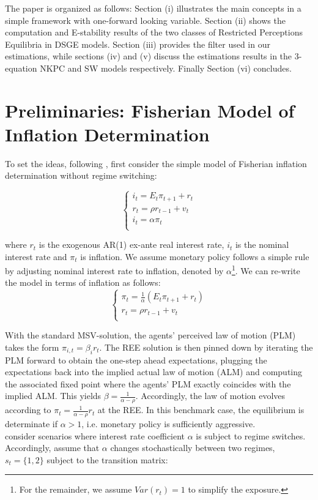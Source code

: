 \documentclass[12pt,reqno]{article}
\numberwithin{equation}{section}
\begin{document}
\noindent
The paper is organized as follows: Section (i) illustrates the main concepts in a simple framework with one-forward looking variable. Section (ii) shows the  computation and E-stability results of the two classes of Restricted Perceptions Equilibria in DSGE models. Section (iii) provides the filter used in our estimations, while sections (iv) and (v) discuss the estimations results in the 3-equation NKPC and SW models respectively. Finally Section (vi) concludes.   


\section{Preliminaries: Fisherian Model of Inflation Determination}



To set the ideas, following \cite{davig2007generalizing}, first consider the simple model of Fisherian inflation determination without regime switching: 


$$
\begin{cases}
i_t = E_t \pi_{t+1} + r_t \\
r_t = \rho r_{t-1} + v_t \\
i_t = \alpha\pi_t \\
\end{cases}
$$

where $ r_t $ is the exogenous AR(1) ex-ante real interest rate, $ i_t $ is the nominal interest rate and $\pi_t $ is inflation. We assume monetary policy follows a simple rule by adjusting nominal interest rate to inflation, denoted by $\alpha$\footnote{For the remainder, we assume $Var(r_t)=1$ to simplify the exposure.}. We can re-write the model in terms of inflation as follows: \\

$$
\begin{cases}
\pi_t = \frac{1}{\alpha}(E_t \pi_{t+1} + r_t) \\
r_t = \rho r_{t-1} + v_t \\
\end{cases}
$$

With the standard MSV-solution, the agents’ perceived law of motion (PLM) takes the form $ \pi_{i,t} = \beta_i r_t $. The REE solution is then pinned down by iterating the PLM forward to obtain the one-step ahead expectations, plugging the expectations back into the implied actual law of motion (ALM) and computing the associated fixed point where the agents’ PLM exactly coincides with the implied ALM. This yields $\beta= \frac{1}{\alpha-\rho}$. Accordingly, the law of motion evolves according to $\pi_t= \frac{1}{\alpha-\rho} r_t $ at the REE. In this benchmark case, the equilibrium is determinate if $\alpha>1 $, i.e. monetary policy is sufficiently aggressive.\\
\cite{davig2007generalizing} consider scenarios where interest rate coefficient $\alpha$ is subject to regime switches. Accordingly, assume that $\alpha$ changes stochastically between two regimes, $s_t = \{1,2 \} $ subject to the transition matrix:
\end{document}
